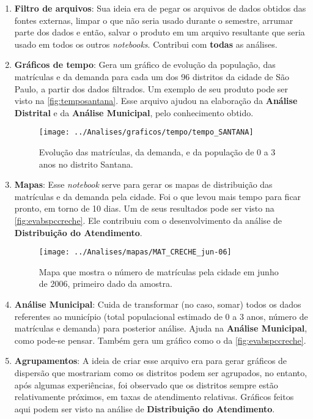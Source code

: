 \documentclass[12pt, a4paper]{article}
\begin{document}
\begin{enumerate}
	\item \textbf{Filtro de arquivos}: Sua ideia era de pegar os arquivos de dados obtidos das fontes externas, limpar o que não seria usado durante o semestre, arrumar parte dos dados e então, salvar o produto em um arquivo resultante que seria usado em todos os outros \textit{notebooks}. Contribui com \textbf{todas} as análises.
	\item \textbf{Gráficos de tempo}: Gera um gráfico de evolução da população, das matrículas e da demanda para cada um dos 96 distritos da cidade de São Paulo, a partir dos dados filtrados. Um exemplo de seu produto pode ser visto na \autoref{fig:temposantana}. Esse arquivo ajudou na elaboração da \textbf{Análise Distrital} e da \textbf{Análise Municipal}, pelo conhecimento obtido.
	\begin{figure}[H]
		\centering
		\texttt{[image: ../Analises/graficos/tempo/tempo\_SANTANA]}
		\caption{Evolução das matrículas, da demanda, e da população de 0 a 3 anos no distrito Santana.}
		\label{fig:temposantana}
	\end{figure}
	\item \textbf{Mapas}: Esse \textit{notebook} serve para gerar os mapas de distribuição das matrículas e da demanda pela cidade. Foi o que levou mais tempo para ficar pronto, em torno de 10 dias. Um de seus resultados pode ser visto na \autoref{fig:evabspccreche}. Ele contribuiu com o desenvolvimento da análise de \textbf{Distribuição do Atendimento}.
	\begin{figure}
		\centering
		\texttt{[image: ../Analises/mapas/MAT\_CRECHE\_jun-06]}
		\caption{Mapa que mostra o número de matrículas pela cidade em junho de 2006, primeiro dado da amostra.}
		\label{fig:evabspccreche}
	\end{figure}
	\item \textbf{Análise Municipal}: Cuida de transformar (no caso, somar) todos os dados referentes ao município (total populacional estimado de 0 a 3 anos, número de matrículas e demanda) para posterior análise. Ajuda na \textbf{Análise Municipal}, como pode-se pensar. Também gera um gráfico como o da \autoref{fig:evabspccreche}.
	\item \textbf{Agrupamentos}: A ideia de criar esse arquivo era para gerar gráficos de dispersão que mostrariam como os distritos podem ser agrupados, no entanto, após algumas experiências, foi observado que os distritos sempre estão relativamente próximos, em taxas de atendimento relativas. Gráficos feitos aqui podem ser visto na análise de \textbf{Distribuição do Atendimento}.

\end{enumerate}
\end{document}
